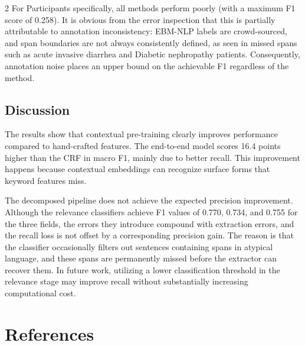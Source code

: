 \documentclass[11pt]{article}
\begin{document}
\begin{multicols}{2}
For Participants specifically, all methods perform poorly (with a maximum F1 score of 0.258). It is obvious from the error inspection that this is partially attributable to annotation inconsistency: EBM-NLP labels are crowd-sourced, and span boundaries are not always consistently defined, as seen in missed spans such as acute invasive diarrhea and Diabetic nephropathy patients. Consequently, annotation noise places an upper bound on the achievable F1 regardless of the method.

\subsection{Discussion}
The results show that contextual pre-training clearly improves performance compared to hand-crafted features. The end-to-end model scores 16.4 points higher than the CRF in macro F1, mainly due to better recall. This improvement happens because contextual embeddings can recognize surface forms that keyword features miss.

The decomposed pipeline does not achieve the expected precision improvement.
Although the relevance classifiers achieve F1 values of 0.770, 0.734, and 0.755 for the three fields, the errors they introduce compound with extraction errors, and the recall loss is not offset by a corresponding precision gain.
The reason is that the classifier occasionally filters out sentences containing spans in atypical language, and these spans are permanently missed before the extractor can recover them.
In future work, utilizing a lower classification threshold in the relevance stage may improve recall without substantially increasing computational cost.

\section*{References}



\end{multicols}
\end{document}
